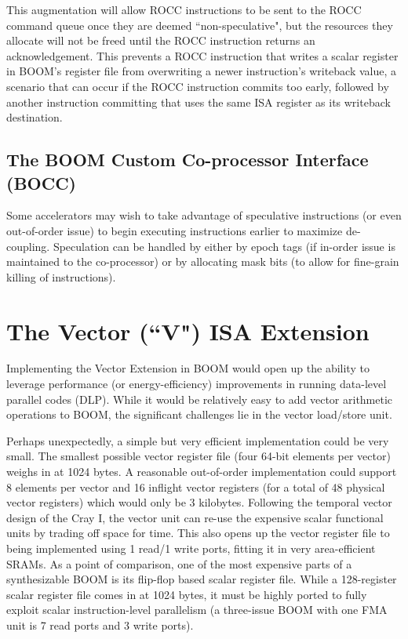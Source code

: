 This augmentation will allow ROCC instructions to be sent to the ROCC command queue once they are deemed ``non-speculative", but the resources they allocate will not be freed until the ROCC instruction returns an acknowledgement.  This prevents a ROCC instruction that writes a scalar register in BOOM's register file from overwriting a newer instruction's writeback value, a scenario that can occur if the ROCC instruction commits too early, followed by another instruction committing that uses the same ISA register as its writeback destination. 


\subsection{The BOOM Custom Co-processor Interface (BOCC)}

Some accelerators may wish to take advantage of speculative instructions (or even out-of-order issue) to begin executing instructions earlier to maximize de-coupling.  Speculation can be handled by either by epoch tags (if in-order issue is maintained to the co-processor) or by allocating mask bits (to allow for fine-grain killing of instructions). 

\section{The Vector (``V") ISA Extension}

Implementing the Vector Extension in BOOM would open up the ability to leverage performance (or energy-efficiency) improvements in running data-level parallel codes (DLP).  While it would be relatively easy to add vector arithmetic operations to BOOM, the significant challenges lie in the vector load/store unit. 

Perhaps unexpectedly, a simple but very efficient implementation could be very small.  The smallest possible vector register file (four 64-bit elements per vector) weighs in at 1024 bytes.  A reasonable out-of-order implementation could support 8 elements per vector and 16 inflight vector registers (for a total of 48 physical vector registers) which would only be 3 kilobytes.  Following the temporal vector design of the Cray I, the vector unit can re-use the expensive scalar functional units by trading off space for time.  This also opens up the vector register file to being implemented using 1 read/1 write ports, fitting it in very area-efficient SRAMs.  As a point of comparison, one of the most expensive parts of a synthesizable BOOM is its flip-flop based scalar register file.  While a 128-register scalar register file comes in at 1024 bytes, it must be highly ported to fully exploit scalar instruction-level parallelism (a three-issue BOOM with one FMA unit is 7 read ports and 3 write ports).


